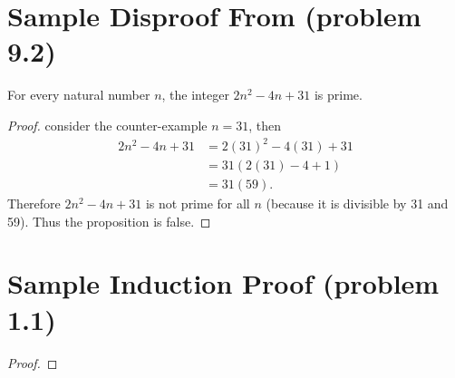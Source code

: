 \documentclass{article}
\begin{document}
	\section*{Sample Disproof From (problem 9.2)}
	
	For every natural number $n$, the integer $2n^2-4n+31$ is prime.
	\begin{proof}
		consider the counter-example $n = 31 $, then 
		\begin{align*}
			2n^2-4n+31 &= 2(31)^2-4(31)+31\\
			&= 31(2(31)-4+1)\\
			&= 31(59).
		\end{align*}
		Therefore $2n^2-4n+31$ is not prime for all $n$ (because it is divisible by 31 and 59). Thus the proposition is 	false.
	\end{proof}
	
	\section*{Sample Induction Proof (problem 1.1)}
	\begin{proof}
		
	\end{proof}
	
\end{document}
